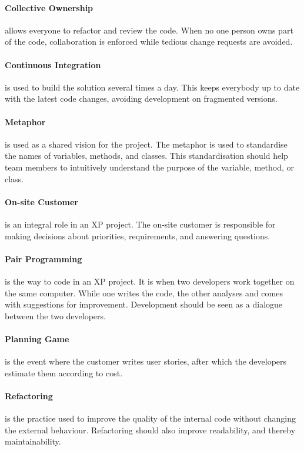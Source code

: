 \paragraph{Collective Ownership} allows everyone to refactor and review the code.
When no one person owns part of the code, collaboration is enforced while tedious change requests are avoided.

\paragraph{Continuous Integration} is used to build the solution several times a day.
This keeps everybody up to date with the latest code changes, avoiding development on fragmented versions.

\paragraph{Metaphor} is used as a shared vision for the project.
The metaphor is used to standardise the names of variables, methods, and classes. 
This standardisation should help team members to intuitively understand the purpose of the variable, method, or class.

\paragraph{On-site Customer} is an integral role in an XP project.
The on-site customer is responsible for making decisions about priorities, requirements, and answering questions.

\paragraph{Pair Programming} is the way to code in an XP project.
It is when two developers work together on the same computer.
While one writes the code, the other analyses and comes with suggestions for improvement.
Development should be seen as a dialogue between the two developers.

\paragraph{Planning Game} is the event where the customer writes user stories, after which the developers estimate them according to cost.

\paragraph{Refactoring} is the practice used to improve the quality of the internal code without changing the external behaviour. Refactoring should also improve readability, and thereby maintainability.

